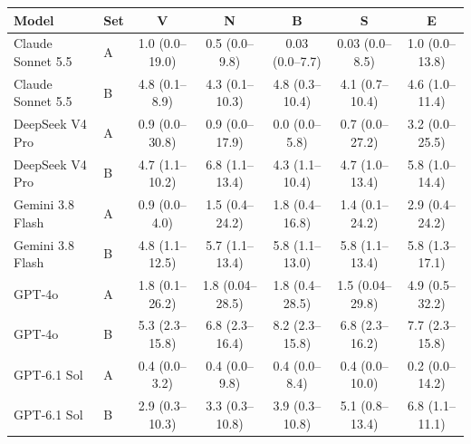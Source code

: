 \begin{tabular}{llccccc}
\toprule
Model & Set & V & N & B & S & E \\
\midrule
Claude Sonnet 5.5 & A & 1.0 (0.0--19.0) & 0.5 (0.0--9.8) & 0.03 (0.0--7.7) & 0.03 (0.0--8.5) & 1.0 (0.0--13.8) \\
Claude Sonnet 5.5 & B & 4.8 (0.1--8.9) & 4.3 (0.1--10.3) & 4.8 (0.3--10.4) & 4.1 (0.7--10.4) & 4.6 (1.0--11.4) \\
DeepSeek V4 Pro & A & 0.9 (0.0--30.8) & 0.9 (0.0--17.9) & 0.0 (0.0--5.8) & 0.7 (0.0--27.2) & 3.2 (0.0--25.5) \\
DeepSeek V4 Pro & B & 4.7 (1.1--10.2) & 6.8 (1.1--13.4) & 4.3 (1.1--10.4) & 4.7 (1.0--13.4) & 5.8 (1.0--14.4) \\
Gemini 3.8 Flash & A & 0.9 (0.0--4.0) & 1.5 (0.4--24.2) & 1.8 (0.4--16.8) & 1.4 (0.1--24.2) & 2.9 (0.4--24.2) \\
Gemini 3.8 Flash & B & 4.8 (1.1--12.5) & 5.7 (1.1--13.4) & 5.8 (1.1--13.0) & 5.8 (1.1--13.4) & 5.8 (1.3--17.1) \\
GPT-4o & A & 1.8 (0.1--26.2) & 1.8 (0.04--28.5) & 1.8 (0.4--28.5) & 1.5 (0.04--29.8) & 4.9 (0.5--32.2) \\
GPT-4o & B & 5.3 (2.3--15.8) & 6.8 (2.3--16.4) & 8.2 (2.3--15.8) & 6.8 (2.3--16.2) & 7.7 (2.3--15.8) \\
GPT-6.1 Sol & A & 0.4 (0.0--3.2) & 0.4 (0.0--9.8) & 0.4 (0.0--8.4) & 0.4 (0.0--10.0) & 0.2 (0.0--14.2) \\
GPT-6.1 Sol & B & 2.9 (0.3--10.3) & 3.3 (0.3--10.8) & 3.9 (0.3--10.8) & 5.1 (0.8--13.4) & 6.8 (1.1--11.1) \\
\bottomrule
\end{tabular}
